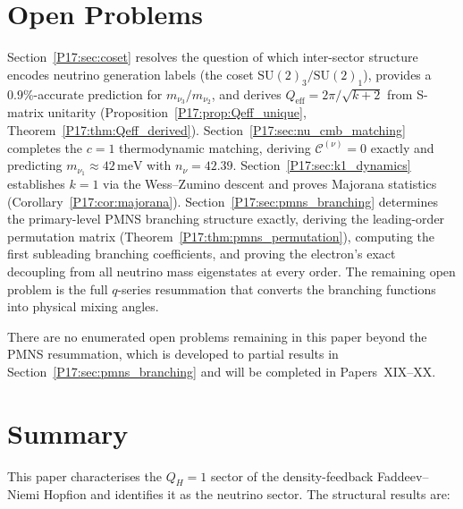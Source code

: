 \documentclass[11pt,a4paper]{article}
\theoremstyle{definition}\newtheorem{definition}[theorem]{Definition}
\theoremstyle{remark}
\newcommand{\SU}{\mathrm{SU}}
\newcommand{\QH}{Q_H}
\begin{document}
\section{Open Problems}
\label{P17:sec:open}

Section~\ref{P17:sec:coset} resolves the question of which inter-sector
structure encodes neutrino generation labels (the coset
$\SU(2)_3/\SU(2)_1$), provides a $0.9\%$-accurate prediction for
$m_{\nu_3}/m_{\nu_2}$, and derives $Q_{\mathrm{eff}}=2\pi/\sqrt{k+2}$
from S-matrix unitarity
(Proposition~\ref{P17:prop:Qeff_unique}, Theorem~\ref{P17:thm:Qeff_derived}).
Section~\ref{P17:sec:nu_cmb_matching} completes the $c=1$ thermodynamic
matching, deriving $\mathcal{C}^{(\nu)}=0$ exactly and
predicting $m_{\nu_1}\approx42\,\mathrm{meV}$ with $n_\nu=42.39$.
Section~\ref{P17:sec:k1_dynamics} establishes $k=1$ via the Wess--Zumino
descent and proves Majorana statistics (Corollary~\ref{P17:cor:majorana}).
Section~\ref{P17:sec:pmns_branching} determines the primary-level PMNS
branching structure exactly, deriving the leading-order permutation
matrix (Theorem~\ref{P17:thm:pmns_permutation}), computing the first
subleading branching coefficients, and proving the electron's exact
decoupling from all neutrino mass eigenstates at every order.
The remaining open problem is the full $q$-series resummation that
converts the branching functions into physical mixing angles.

\medskip\noindent
There are no enumerated open problems remaining in this paper beyond
the PMNS resummation, which is developed to partial results in
Section~\ref{P17:sec:pmns_branching} and will be completed in Papers~XIX--XX.

\section{Summary}
\label{P17:sec:summary}

This paper characterises the $\QH=1$ sector of the density-feedback
Faddeev--Niemi Hopfion and identifies it as the neutrino sector. The
structural results are:
\end{document}
